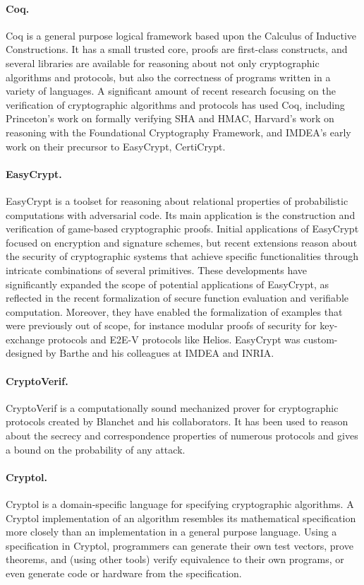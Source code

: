 \paragraph{Coq.} Coq is a general purpose logical framework based upon
the Calculus of Inductive Constructions. It has a small trusted core,
proofs are first-class constructs, and several libraries are available
for reasoning about not only cryptographic algorithms and protocols,
but also the correctness of programs written in a variety of
languages. A significant amount of recent research focusing on the
verification of cryptographic algorithms and protocols has used Coq,
including Princeton's work on formally verifying SHA and HMAC,
Harvard's work on reasoning with the Foundational Cryptography
Framework, and IMDEA's early work on their precursor to EasyCrypt,
CertiCrypt.

\paragraph{EasyCrypt.} EasyCrypt is a toolset for reasoning about
relational properties of probabilistic computations with adversarial
code. Its main application is the construction and verification of
game-based cryptographic proofs. Initial applications of EasyCrypt
focused on encryption and signature schemes, but recent extensions
reason about the security of cryptographic systems that achieve
specific functionalities through intricate combinations of several
primitives. These developments have significantly expanded the scope
of potential applications of EasyCrypt, as reflected in the recent
formalization of secure function evaluation and verifiable
computation. Moreover, they have enabled the formalization of examples
that were previously out of scope, for instance modular proofs of
security for key-exchange protocols and E2E-V protocols like Helios.
EasyCrypt was custom-designed by Barthe and his colleagues at IMDEA
and INRIA.

\paragraph{CryptoVerif.} CryptoVerif is a computationally sound
mechanized prover for cryptographic protocols created by Blanchet and
his collaborators. It has been used to reason about the secrecy and
correspondence properties of numerous protocols and gives a bound on
the probability of any attack.

\paragraph{Cryptol.} Cryptol is a domain-specific language for
specifying cryptographic algorithms. A Cryptol implementation of an
algorithm resembles its mathematical specification more closely than
an implementation in a general purpose language. Using a specification
in Cryptol, programmers can generate their own test vectors, prove
theorems, and (using other tools) verify equivalence to their own
programs, or even generate code or hardware from the specification.

